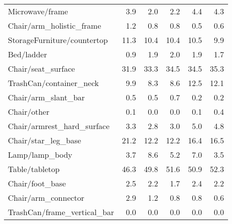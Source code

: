 \begin{table}[!h]
\begin{tabular}{lrrrrr}
Microwave/frame                &            3.9 &             2.0 &                     2.2 &           4.4 &                   4.3 \\
Chair/arm\_holistic\_frame       &            1.2 &             0.8 &                     0.8 &           0.5 &                   0.6 \\
StorageFurniture/countertop    &           11.3 &            10.4 &                    10.4 &          10.5 &                   9.9 \\
Bed/ladder                     &            0.9 &             1.9 &                     2.0 &           1.9 &                   1.7 \\
Chair/seat\_surface             &           31.9 &            33.3 &                    34.5 &          34.5 &                  35.3 \\
TrashCan/container\_neck        &            9.9 &             8.3 &                     8.6 &          12.5 &                  12.1 \\
Chair/arm\_slant\_bar            &            0.5 &             0.5 &                     0.7 &           0.2 &                   0.2 \\
Chair/other                    &            0.1 &             0.0 &                     0.0 &           0.1 &                   0.4 \\
Chair/armrest\_hard\_surface     &            3.3 &             2.8 &                     3.0 &           5.0 &                   4.8 \\
Chair/star\_leg\_base            &           21.2 &            12.2 &                    12.2 &          16.4 &                  16.5 \\
Lamp/lamp\_body                 &            3.7 &             8.6 &                     5.2 &           7.0 &                   3.5 \\
Table/tabletop                 &           46.3 &            49.8 &                    51.6 &          50.9 &                  52.3 \\
Chair/foot\_base                &            2.5 &             2.2 &                     1.7 &           2.4 &                   2.2 \\
Chair/arm\_connector            &            2.9 &             1.2 &                     0.8 &           0.8 &                   0.6 \\
TrashCan/frame\_vertical\_bar    &            0.0 &             0.0 &                     0.0 &           0.0 &                   0.0 \\

\end{tabular}
\end{table}
